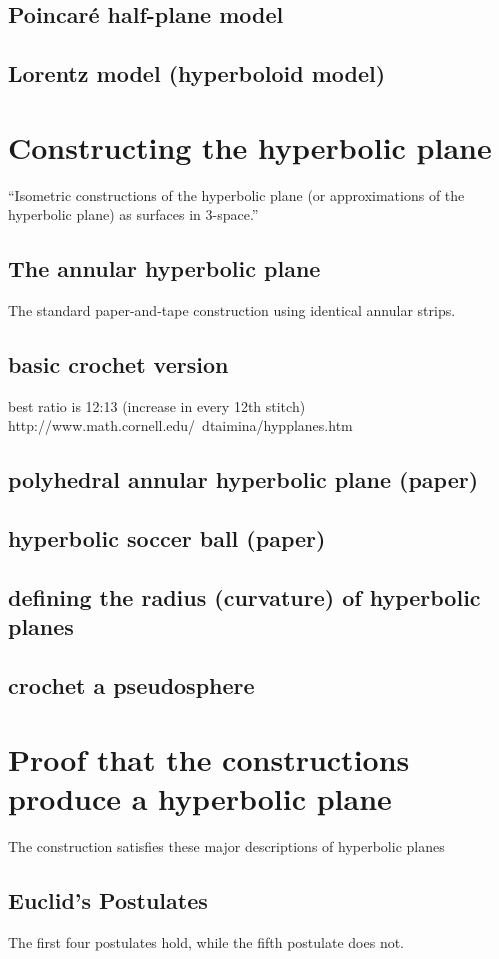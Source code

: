 \documentclass{article}
\begin{document}
\subsection{Poincar\'e half-plane model}
\subsection{Lorentz model (hyperboloid model)}

\section{Constructing the hyperbolic plane}
``Isometric constructions of the hyperbolic plane (or approximations of the hyperbolic plane) as surfaces in 3-space.'' \cite{crochetplane}
\subsection{The annular hyperbolic plane}
The standard paper-and-tape construction using identical annular strips.
\subsection{basic crochet version}
best ratio is 12:13 (increase in every 12th stitch) http://www.math.cornell.edu/~dtaimina/hypplanes.htm
\subsection{polyhedral annular hyperbolic plane (paper)}
\subsection{hyperbolic soccer ball (paper)}
\subsection{defining the radius (curvature) of hyperbolic planes}
\subsection{crochet a pseudosphere}

\section{Proof that the constructions produce a hyperbolic plane}
The construction satisfies these major descriptions of hyperbolic planes
\subsection{Euclid's Postulates}
The first four postulates hold, while the fifth postulate does not.
\end{document}
